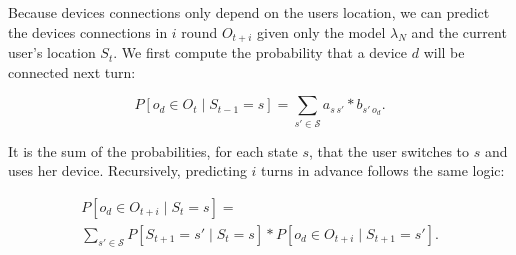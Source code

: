 Because devices connections only depend on the users location, we can predict the devices connections in $i$ round $O_{t+i}$ given only the model $\lambda_N$ and the current user's location $S_t$. We first compute the probability that a device $d$ will be connected next turn:

$$
P\left[ o_d \in O_{t} \mid S_{t-1} = s \right] = 
\sum\limits_{s' \in \mathcal{S}} 
a_{s\,s'} * b_{s'\,o_d}.
$$

It is the sum of the probabilities, for each state $s$, that the user switches to $s$ and uses her device.
Recursively, predicting $i$ turns in advance follows the same logic:

\begin{multline*}
P\left[ o_d \in O_{t+i} \mid S_{t} = s \right] = \\
\sum\limits_{s' \in \mathcal{S}}
P\left[ S_{t+1} = s' \mid S_t = s \right] * 
P\left[ o_d \in O_{t+i} \mid S_{t+1} = s'\right].
\end{multline*}


